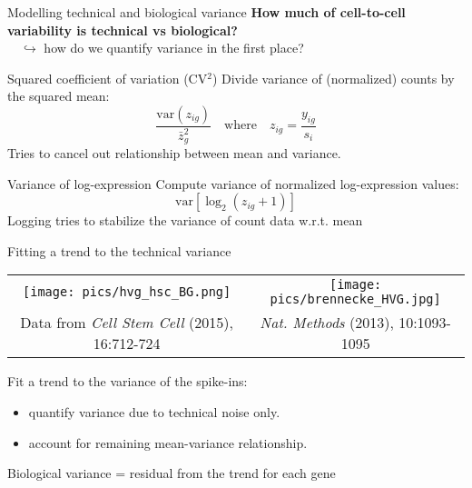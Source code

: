 \documentclass{beamer}
\begin{document}
\begin{frame}{Modelling technical and biological variance}
    \textbf{How much of cell-to-cell variability is technical vs biological?} \\
$\quad\hookrightarrow$ how do we quantify variance in the first place?
\begin{block}{Squared coefficient of variation (CV$^2$)}
    Divide variance of (normalized) counts by the squared mean:
    \[
        \frac{\mbox{var}(z_{ig})}{\bar{z}^2_g} \quad\mbox{where}\quad z_{ig} = \frac{y_{ig}}{s_i}
    \]
    Tries to cancel out relationship between mean and variance.
\end{block}
\begin{block}{Variance of log-expression}
    Compute variance of normalized log-expression values:
    \[
        \mbox{var}[\log_2(z_{ig} + 1)]
    \]
    Logging tries to stabilize the variance of count data w.r.t. mean
\end{block}
\end{frame}

\begin{frame}{Fitting a trend to the technical variance}
    \vspace{-0.2in}
\begin{center}
    \begin{tabular}{c@{}c}
    \texttt{[image: pics/hvg\_hsc\_BG.png]} &
    \texttt{[image: pics/brennecke\_HVG.jpg]} \\
    {\tiny Data from \emph{Cell Stem Cell} (2015), 16:712-724} &
    {\tiny \emph{Nat. Methods} (2013), 10:1093-1095}
\end{tabular}
\end{center}
Fit a trend to the variance of the spike-ins:
\begin{itemize}
    \item quantify variance due to technical noise only.
    \item account for remaining mean-variance relationship.
\end{itemize}
Biological variance = residual from the trend for each gene
\end{frame}
\end{document}
